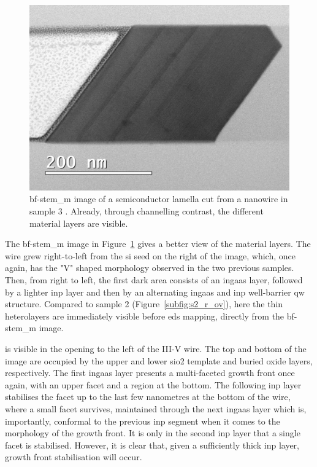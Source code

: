 \begin{figure}
    \centering
    \includegraphics[width=\textwidth]{3_Growth/s3_ov.pdf}
    \caption{\acs{bf}-\acs{stem_m} image of a semiconductor lamella cut from a nanowire in sample 3 \cite{Brugnolotto2023}. Already, through channelling contrast, the different material layers are visible.}
    \label{fig:s3_ov}
\end{figure}

The \acs{bf}-\acs{stem_m} image in Figure~\ref{fig:s3_ov} gives a better view of the material layers. The wire grew right-to-left from the \acs{si} seed on the right of the image, which, once again, has the "V" shaped morphology observed in the two previous samples. Then, from right to left, the first dark area consists of an \acs{ingaas} layer, followed by a lighter \acs{inp} layer and then by an alternating \acs{ingaas} and \acs{inp} well-barrier \acl{qw} structure. Compared to sample 2 (Figure~\ref{subfig:s2_r_ov}), here the thin heterolayers are immediately visible before \acs{eds} mapping, directly from the \acs{bf}-\acs{stem_m} image.

 is visible in the opening to the left of the III-V wire. The top and bottom of the image are occupied by the upper and lower \acs{sio2} template and buried oxide layers, respectively. The first \acs{ingaas} layer presents a multi-faceted growth front once again, with an upper  facet and a  region at the bottom. The following \acs{inp} layer stabilises the  facet up to the last few nanometres at the bottom of the wire, where a small  facet survives, maintained through the next \acs{ingaas} layer which is, importantly, conformal to the previous \acs{inp} segment when it comes to the morphology of the growth front. It is only in the second \acs{inp} layer that a single  facet is stabilised. However, it is clear that, given a sufficiently thick \acs{inp} layer, growth front stabilisation will occur.

